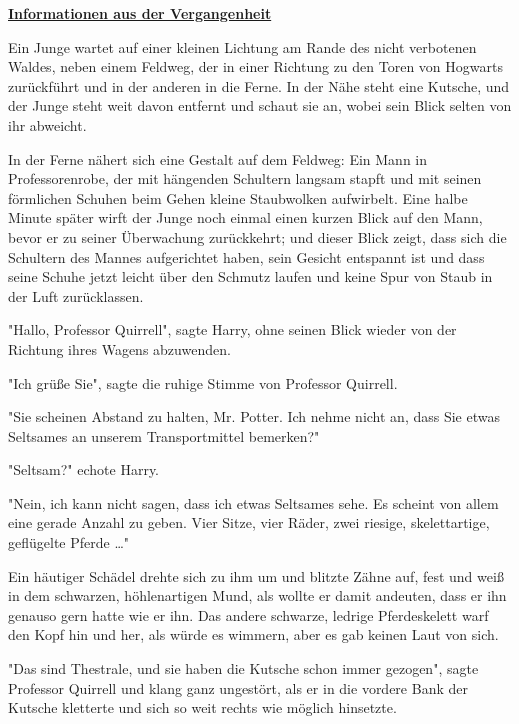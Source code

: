 

\hypertarget{informationen-aus-der-vergangenheit}{%

\textbf{\uline{Informationen aus der Vergangenheit}}

Ein Junge wartet auf einer kleinen Lichtung am Rande des nicht verbotenen Waldes, neben einem Feldweg, der in einer Richtung zu den Toren von Hogwarts zurückführt und in der anderen in die Ferne. In der Nähe steht eine Kutsche, und der Junge steht weit davon entfernt und schaut sie an, wobei sein Blick selten von ihr abweicht.

In der Ferne nähert sich eine Gestalt auf dem Feldweg: Ein Mann in Professorenrobe, der mit hängenden Schultern langsam stapft und mit seinen förmlichen Schuhen beim Gehen kleine Staubwolken aufwirbelt. Eine halbe Minute später wirft der Junge noch einmal einen kurzen Blick auf den Mann, bevor er zu seiner Überwachung zurückkehrt; und dieser Blick zeigt, dass sich die Schultern des Mannes aufgerichtet haben, sein Gesicht entspannt ist und dass seine Schuhe jetzt leicht über den Schmutz laufen und keine Spur von Staub in der Luft zurücklassen.

"Hallo, Professor Quirrell", sagte Harry, ohne seinen Blick wieder von der Richtung ihres Wagens abzuwenden.

"Ich grüße Sie", sagte die ruhige Stimme von Professor Quirrell.

"Sie scheinen Abstand zu halten, Mr. Potter. Ich nehme nicht an, dass Sie etwas Seltsames an unserem Transportmittel bemerken?"

"Seltsam?" echote Harry.

"Nein, ich kann nicht sagen, dass ich etwas Seltsames sehe. Es scheint von allem eine gerade Anzahl zu geben. Vier Sitze, vier Räder, zwei riesige, skelettartige, geflügelte Pferde …"

Ein häutiger Schädel drehte sich zu ihm um und blitzte Zähne auf, fest und weiß in dem schwarzen, höhlenartigen Mund, als wollte er damit andeuten, dass er ihn genauso gern hatte wie er ihn. Das andere schwarze, ledrige Pferdeskelett warf den Kopf hin und her, als würde es wimmern, aber es gab keinen Laut von sich.

"Das sind Thestrale, und sie haben die Kutsche schon immer gezogen", sagte Professor Quirrell und klang ganz ungestört, als er in die vordere Bank der Kutsche kletterte und sich so weit rechts wie möglich hinsetzte.

}
